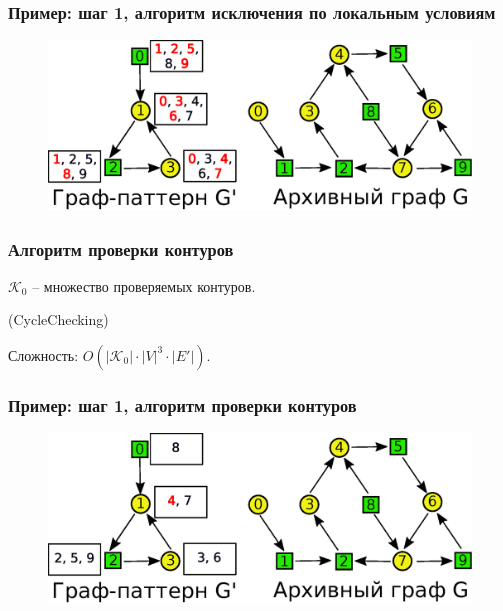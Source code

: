 \documentclass{beamer}
\begin{document}
\begin{frame}
\frametitle{Пример: шаг 1, алгоритм исключения по локальным условиям}
\begin{figure}[H]
	\centering
	\includegraphics[width=1\textwidth]{ee1}
	\label{fig:ee1}
\end{figure}
\end{frame}

\begin{frame}
\frametitle{Алгоритм проверки контуров}
$\mathcal{K}_0$ -- множество проверяемых контуров.

\begin{algorithm}[H]
	\Begin(CycleChecking){
	}
\end{algorithm}

Сложность: $O(|\mathcal{K}_0| \cdot |V|^3 \cdot |E'|)$.
\end{frame}

\begin{frame}
\frametitle{Пример: шаг 1, алгоритм проверки контуров}
\begin{figure}[H]
	\centering
	\includegraphics[width=1\textwidth]{ee4}
	\label{fig:ee4}
\end{figure}
\end{frame}
\end{document}
